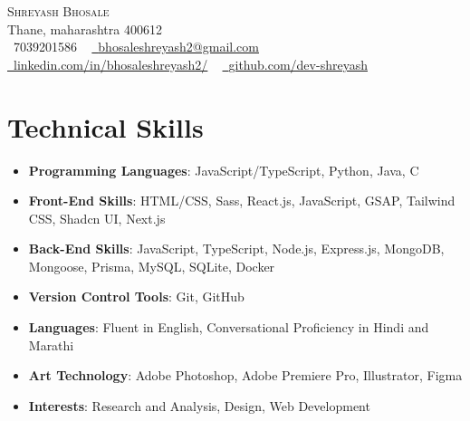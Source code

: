 \documentclass[letterpaper,10.5pt]{article}
\newcommand{\resumeItem}[2]{
  \item\small{
    \textbf{#1}{: #2 \vspace{-2pt}}
  }
}
\newcommand{\resumeSubItem}[2]{\resumeItem{#1}{#2}\vspace{-4pt}}
\newcommand{\resumeSubHeadingListStart}{\begin{itemize}[leftmargin=*, label={}]}
\newcommand{\resumeSubHeadingListEnd}{\end{itemize}}
\begin{document}
\begin{center}
    {\Huge \scshape Shreyash Bhosale} \\ \vspace{1pt}
    Thane, maharashtra 400612 \\ \vspace{1pt}
    \small \raisebox{-0.1\height}\faPhone\ 7039201586 ~ \href{mailto:x@gmail.com}{\raisebox{-0.2\height}\faEnvelope\  \underline{bhosaleshreyash2@gmail.com}} ~ 
    \href{https://linkedin.com/in//}{\raisebox{-0.2\height}\faLinkedin\ \underline{linkedin.com/in/bhosaleshreyash2/}}  ~
    \href{https://github.com/}{\raisebox{-0.2\height}\faGithub\ \underline{github.com/dev-shreyash}}
    \vspace{-8pt}
\end{center}


    

  
\section{Technical Skills}
    \resumeSubHeadingListStart

    \resumeSubItem{Programming Languages}{JavaScript/TypeScript, Python, Java, C}
    \resumeSubItem{Front-End Skills}{HTML/CSS, Sass, React.js, JavaScript, GSAP, Tailwind CSS, Shadcn UI, Next.js}
    \resumeSubItem{Back-End Skills}{JavaScript, TypeScript, Node.js, Express.js, MongoDB, Mongoose, Prisma, MySQL, SQLite, Docker}
    \resumeSubItem{Version Control Tools}{Git, GitHub}
    \resumeSubItem{Languages}{Fluent in English, Conversational Proficiency in Hindi and Marathi}
    \resumeSubItem{Art Technology}{Adobe Photoshop, Adobe Premiere Pro, Illustrator, Figma}
    \resumeSubItem{Interests}{Research and Analysis, Design, Web Development}
    
    \resumeSubHeadingListEnd
\end{document}
